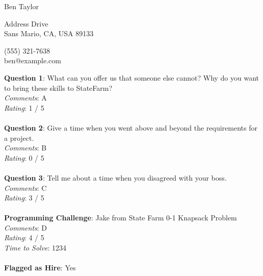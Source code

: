 \documentclass[12pt]{article}
\begin{document}
{\LARGE \begin{center}Ben Taylor\end{center}}

\begin{multicols}{2}
 Address Drive \\
Sans Mario, CA, USA 89133
\columnbreak

\noindent
(555) 321-7638 \\
ben@example.com
\end{multicols}

\noindent
\textbf{Question 1}: What can you offer us that someone else cannot? Why do you want to bring these skills to StateFarm?
\\\noindent
\textit{Comments}: A
\\\noindent
\textit{Rating}: 1 / 5
\\\\
\noindent
\textbf{Question 2}: Give a time when you went above and beyond the requirements for a project.
\\\noindent
\textit{Comments}: B
\\\noindent
\textit{Rating}: 0 / 5
\\\\
\noindent
\textbf{Question 3}: Tell me about a time when you disagreed with your boss.
\\\noindent
\textit{Comments}: C
\\\noindent
\textit{Rating}: 3 / 5
\\\\
\noindent
\textbf{Programming Challenge}: Jake from State Farm 0-1 Knapsack Problem
\\\noindent
\textit{Comments}: D
\\\noindent
\textit{Rating}: 4 / 5
\\\noindent
\textit{Time to Solve}: 1234
\\\\
\textbf{Flagged as Hire}: Yes
\\\\ 
\end{document}
